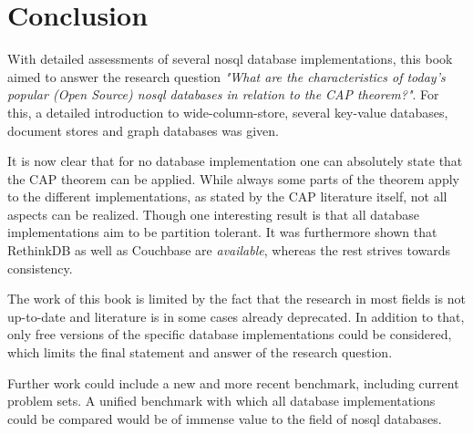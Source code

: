 \chapter{Conclusion}

With detailed assessments of several \gls{nosql} database implementations, this
book aimed to answer the research question \textit{"What are the
characteristics of today's popular (Open Source) \gls{nosql} databases in
relation to the CAP theorem?"}. For this, a detailed introduction to
wide-column-store, several key-value databases, document stores and graph
databases was given.

It is now clear that for no database implementation one can absolutely state
that the CAP theorem can be applied. While always some parts of the theorem
apply to the different implementations, as stated by the CAP literature itself,
not all aspects can be realized. Though one interesting result is that all
database implementations aim to be partition tolerant. It was furthermore shown
that RethinkDB as well as Couchbase are \textit{available}, whereas the rest
strives towards consistency.

The work of this book is limited by the fact that the research in most fields
is not up-to-date and literature is in some cases already deprecated. In
addition to that, only free versions of the specific database implementations
could be considered, which limits the final statement and answer of the
research question.

Further work could include a new and more recent benchmark, including current
problem sets. A unified benchmark with which all database implementations could
be compared would be of immense value to the field of \gls{nosql} databases.
